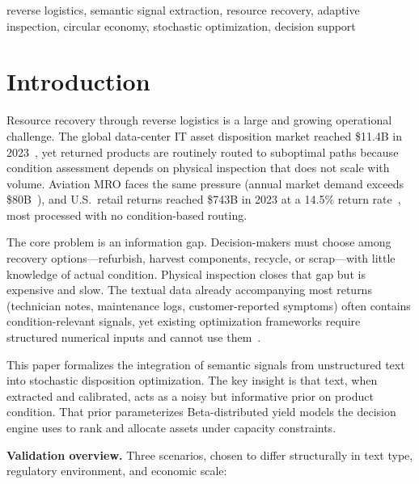 \documentclass[conference]{IEEEtran}
\begin{document}
\begin{IEEEkeywords}
reverse logistics, semantic signal extraction, resource recovery,
adaptive inspection, circular economy, stochastic optimization, decision support
\end{IEEEkeywords}

\section{Introduction}\label{sec:intro}

Resource recovery through reverse logistics is a large and growing operational
challenge. The global data-center IT asset disposition market reached \$11.4B in
2023~\cite{GlobalMktInsights}, yet returned products are routinely routed to
suboptimal paths because condition assessment depends on physical inspection that
does not scale with volume. Aviation MRO faces the same pressure (annual market
demand exceeds \$80B~\cite{OliverWyman}), and U.S.\ retail returns reached \$743B
in 2023 at a 14.5\% return rate~\cite{NRF}, most processed with no condition-based
routing.

The core problem is an information gap. Decision-makers must choose among
recovery options---refurbish, harvest components, recycle, or scrap---with little
knowledge of actual condition. Physical inspection closes that gap but is
expensive and slow. The textual data already accompanying most returns (technician
notes, maintenance logs, customer-reported symptoms) often contains
condition-relevant signals, yet existing optimization frameworks require
structured numerical inputs and cannot use
them~\cite{Godichaud2022,Govindan2015}.

This paper formalizes the integration of semantic signals from unstructured text
into stochastic disposition optimization. The key insight is that text, when
extracted and calibrated, acts as a noisy but informative prior on product
condition. That prior parameterizes Beta-distributed yield models the decision
engine uses to rank and allocate assets under capacity constraints.

\smallskip\noindent\textbf{Validation overview.}
Three scenarios, chosen to differ structurally in text type, regulatory
environment, and economic scale:
\end{document}
